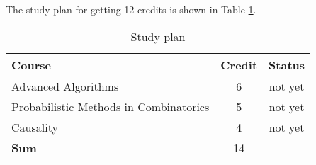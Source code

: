The study plan for getting 12 credits is shown in Table \ref{tbl:study_plan}.
\begin{table}[!ht]
  \centering
  \caption{Study plan}
  \begin{tabular}{l c c}
    \midrule
    \textbf{Course} & \textbf{Credit} & \textbf{Status}\\ \hline\midrule
    Advanced Algorithms & 6 & not yet \\\midrule
    Probabilistic Methods in Combinatorics & 5 & not yet \\\midrule
    Causality & 4 & not yet\\\hline\midrule
    \textbf{Sum} & 14\\
  \end{tabular}
  \label{tbl:study_plan}
\end{table}
